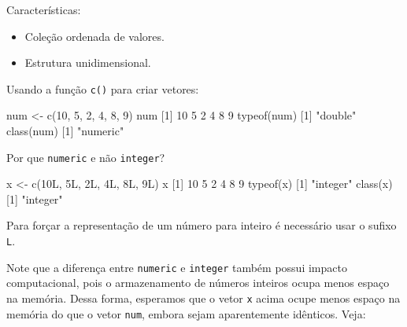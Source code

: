 \documentclass[
  10pt,
  a4paper]{book}
\newenvironment{Shaded}{\begin{snugshade}}{\end{snugshade}}
\newcommand{\DecValTok}[1]{\textcolor[rgb]{0.00,0.00,0.81}{#1}}
\newcommand{\FunctionTok}[1]{\textcolor[rgb]{0.00,0.00,0.00}{#1}}
\newcommand{\NormalTok}[1]{#1}
\newcommand{\OtherTok}[1]{\textcolor[rgb]{0.56,0.35,0.01}{#1}}
\newcommand{\StringTok}[1]{\textcolor[rgb]{0.31,0.60,0.02}{#1}}
\providecommand{\tightlist}{%
  \setlength{\itemsep}{0pt}\setlength{\parskip}{0pt}}
\begin{document}
Características:

\begin{itemize}
\tightlist
\item
  Coleção ordenada de valores.
\item
  Estrutura unidimensional.
\end{itemize}

Usando a função \texttt{c()} para criar vetores:

\begin{Shaded}
\begin{Highlighting}[]
\NormalTok{num }\OtherTok{\textless{}{-}} \FunctionTok{c}\NormalTok{(}\DecValTok{10}\NormalTok{, }\DecValTok{5}\NormalTok{, }\DecValTok{2}\NormalTok{, }\DecValTok{4}\NormalTok{, }\DecValTok{8}\NormalTok{, }\DecValTok{9}\NormalTok{)}
\NormalTok{num}
\NormalTok{[}\DecValTok{1}\NormalTok{] }\DecValTok{10}  \DecValTok{5}  \DecValTok{2}  \DecValTok{4}  \DecValTok{8}  \DecValTok{9}
\FunctionTok{typeof}\NormalTok{(num)}
\NormalTok{[}\DecValTok{1}\NormalTok{] }\StringTok{"double"}
\FunctionTok{class}\NormalTok{(num)}
\NormalTok{[}\DecValTok{1}\NormalTok{] }\StringTok{"numeric"}
\end{Highlighting}
\end{Shaded}

Por que \texttt{numeric} e não \texttt{integer}?

\begin{Shaded}
\begin{Highlighting}[]
\NormalTok{x }\OtherTok{\textless{}{-}} \FunctionTok{c}\NormalTok{(10L, 5L, 2L, 4L, 8L, 9L)}
\NormalTok{x}
\NormalTok{[}\DecValTok{1}\NormalTok{] }\DecValTok{10}  \DecValTok{5}  \DecValTok{2}  \DecValTok{4}  \DecValTok{8}  \DecValTok{9}
\FunctionTok{typeof}\NormalTok{(x)}
\NormalTok{[}\DecValTok{1}\NormalTok{] }\StringTok{"integer"}
\FunctionTok{class}\NormalTok{(x)}
\NormalTok{[}\DecValTok{1}\NormalTok{] }\StringTok{"integer"}
\end{Highlighting}
\end{Shaded}

Para forçar a representação de um número para inteiro é necessário usar
o sufixo \texttt{L}.

Note que a diferença entre \texttt{numeric} e \texttt{integer} também possui impacto
computacional, pois o armazenamento de números inteiros ocupa menos
espaço na memória. Dessa forma, esperamos que o vetor \texttt{x} acima ocupe
menos espaço na memória do que o vetor \texttt{num}, embora sejam aparentemente
idênticos. Veja:
\end{document}
